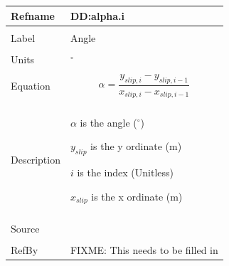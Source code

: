 \documentclass[12pt]{article}
\begin{document}
\noindent \begin{minipage}{\textwidth}
\begin{tabular}{p{} p{}}
\toprule \textbf{Refname} & \textbf{DD:alpha.i}
\label{DD:alpha.i}
\\ \midrule \\
Label & Angle
\\ \midrule \\
Units & ${}^{\circ}$
\\ \midrule \\
Equation & \begin{dmath}
           α=\frac{{y_{slip,i}}-{y_{slip,i-1}}}{{x_{slip,i}}-{x_{slip,i-1}}}
           \end{dmath}
\\ \midrule \\
Description & \begin{symbDescription}
              \item{$α$ is the angle (${}^{\circ}$)}
              \item{${y_{slip}}$ is the y ordinate (m)}
              \item{$i$ is the index (Unitless)}
              \item{${x_{slip}}$ is the x ordinate (m)}
              \end{symbDescription}
\\ \midrule \\
Source &
\\ \midrule \\
RefBy & FIXME: This needs to be filled in
\\ \bottomrule \end{tabular}
\end{minipage}\\
~\newline
\end{document}
